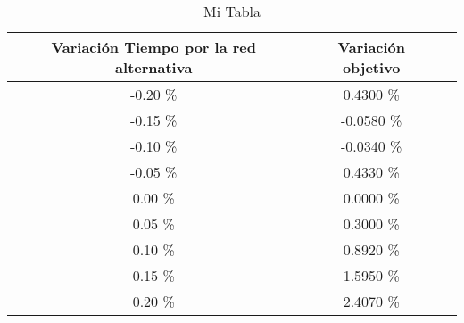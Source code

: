 \begin{table}
\centering
\begin{tabular}{|c|c|c|}
\hline
 Variación Tiempo por la red alternativa & Variación objetivo \\ \hline
-0.20 \% & 0.4300 \% \\ \hline
-0.15 \% & -0.0580 \% \\ \hline
-0.10 \% & -0.0340 \% \\ \hline
-0.05 \% & 0.4330 \% \\ \hline
0.00 \% & 0.0000 \% \\ \hline
0.05 \% & 0.3000 \% \\ \hline
0.10 \% & 0.8920 \% \\ \hline
0.15 \% & 1.5950 \% \\ \hline
0.20 \% & 2.4070 \% \\ \hline
\end{tabular}
\caption{Mi Tabla}
\end{table}
